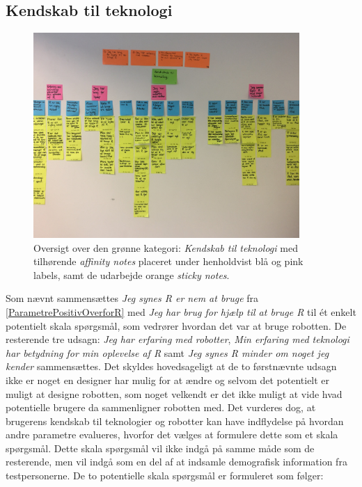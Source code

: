 \subsection{Kendskab til teknologi}
\label{ParametreKendskabTilTeknologi}
%
\begin{figure}[H]
\centering
\includegraphics[width = 0.9\textwidth]{Figure/AffinityDiagram/KendskabTilTeknologi} 
\caption{Oversigt over den grønne kategori: \textit{Kendskab til teknologi} med tilhørende \textit{affinity notes} placeret under henholdvist blå og pink labels, samt de udarbejde orange \textit{sticky notes}.}
\label{fig:AFKendskabTilTeknologi}
\end{figure}
\noindent
%
Som nævnt sammensættes \textit{Jeg synes R er nem at bruge} fra \autoref{ParametrePositivOverforR} med \textit{Jeg har brug for hjælp til at bruge R} til ét enkelt potentielt skala spørgsmål, som vedrører hvordan det var at bruge robotten. De resterende tre udsagn: \textit{Jeg har erfaring med robotter}, \textit{Min erfaring med teknologi har betydning for min oplevelse af R} samt \textit{Jeg synes R minder om noget jeg kender} sammensættes. Det skyldes hovedsageligt at de to førstnævnte udsagn ikke er noget en designer har mulig for at ændre og selvom det potentielt er muligt at designe robotten, som noget velkendt er det ikke muligt at vide hvad potentielle brugere da sammenligner robotten med. Det vurderes dog, at brugerens kendskab til teknologier og robotter kan have indflydelse på hvordan andre parametre evalueres, hvorfor det vælges at formulere dette som et skala spørgsmål. Dette skala spørgsmål vil ikke indgå på samme måde som de resterende, men vil indgå som en del af at indsamle demografisk information fra testpersonerne. De to potentielle skala spørgsmål er formuleret som følger:\blankline

